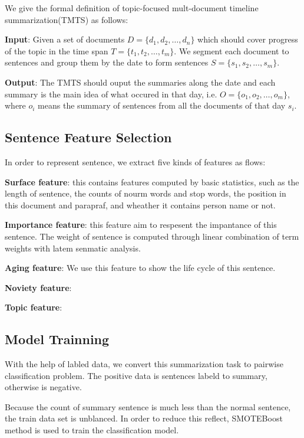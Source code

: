\documentclass{llncs}
\begin{document}
We give the formal definition of topic-focused mult-document timeline summarization(TMTS) as follows:

\textbf{Input}: Given a set of documents $D=\{d_1, d_2, \dots, d_n\}$ which should cover progress of the topic in the time span $T=\{t_1, t_2, \dots, t_m\}$. We segment each document to sentences and group them by the date to form sentences $S=\{s_1, s_2, \dots, s_m\}$. 

\textbf{Output}: The TMTS should ouput the summaries along the date and each summary is the main idea of what occured in that day, i.e. $O=\{o_1, o_2, \dots, o_m\}$, where $o_i$ means the summary of sentences from all the documents of that day $s_i$.

\subsection{Sentence Feature Selection}

In order to represent sentence, we extract five kinds of features as flows:

\textbf{Surface feature}: this contains features computed by basic statistics, such as the length of sentence, the counts of nourm words and stop words, the position in this document and parapraf, and wheather it contains person name or not.

\textbf{Importance feature}: this feature aim to respesent the impantance of this sentence. The weight of sentence is computed through linear combination of term weights with latem senmatic analysis.

\textbf{Aging feature}: We use this feature to show the life cycle of this sentence.

\textbf{Noviety feature}: 

\textbf{Topic feature}: 


\subsection{Model Trainning}

With the help of labled data, we convert this summarization task to pairwise classification problem. The positive data is sentences labeld to summary, otherwise is negative. 

Because the count of summary sentence is much less than the normal sentence, the train data set is unblanced. In order to reduce this reflect, SMOTEBoost method is used to train the classification model.
\end{document}
